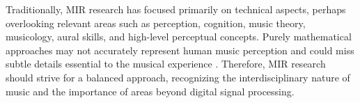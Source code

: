 Traditionally, MIR research has focused primarily on technical aspects, perhaps overlooking relevant areas such as perception, cognition, music theory, musicology, aural skills, and high-level perceptual concepts. Purely mathematical approaches may not accurately represent human music perception and could miss subtle details essential to the musical experience \cite{neglecteduser2013}. Therefore, MIR research should strive for a balanced approach, recognizing the interdisciplinary nature of music and the importance of areas beyond digital signal processing.